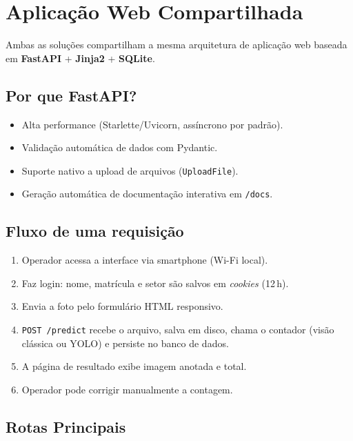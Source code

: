 \documentclass[12pt,a4paper]{article}
\begin{document}
\section{Aplica\c{c}\~ao Web Compartilhada}
\label{sec:web}

Ambas as solu\c{c}\~oes compartilham a mesma arquitetura de aplica\c{c}\~ao web
baseada em \textbf{FastAPI} + \textbf{Jinja2} + \textbf{SQLite}.

\subsection{Por que FastAPI?}

\begin{itemize}[leftmargin=*]
  \item Alta performance (Starlette/Uvicorn, ass\'incrono por padr\~ao).
  \item Valida\c{c}\~ao autom\'atica de dados com Pydantic.
  \item Suporte nativo a upload de arquivos (\texttt{UploadFile}).
  \item Gera\c{c}\~ao autom\'atica de documenta\c{c}\~ao interativa em \texttt{/docs}.
\end{itemize}

\subsection{Fluxo de uma requisi\c{c}\~ao}

\begin{enumerate}[leftmargin=*, label=\arabic*.]
  \item Operador acessa a interface via smartphone (Wi-Fi local).
  \item Faz login: nome, matr\'icula e setor s\~ao salvos em \emph{cookies} (12\,h).
  \item Envia a foto pelo formul\'ario HTML responsivo.
  \item \texttt{POST /predict} recebe o arquivo, salva em disco, chama o contador
        (vis\~ao cl\'assica ou YOLO) e persiste no banco de dados.
  \item A p\'agina de resultado exibe imagem anotada e total.
  \item Operador pode corrigir manualmente a contagem.
\end{enumerate}

\subsection{Rotas Principais}
\end{document}
